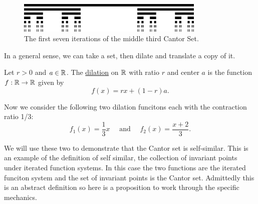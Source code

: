 \begin{figure}[h]
    \includegraphics[width=0.8\textwidth]{Content/Images/Cantor_set_in_seven_iterations.jpg}
    \centering
    \caption{The first seven iterations of the middle third Cantor Set.}
\end{figure}
In a general sense, we can take a set, then dilate and translate a copy of it. 

\begin{definition}[Dilation]\cite{GEdgar}
    Let $r>0$ and $a \in \mathbb{R}$.  The \underline{dilation} on $\mathbb{R}$ with ratio $r$ and center $a$ is the function $f: \mathbb{R} \to \mathbb{R}$ given by $$f(x)= rx + (1-r) a.$$
\end{definition}

Now we consider the following two dilation funcitons each with the contraction ratio 1/3: 
$$f_1 (x) = \frac{1}{3}x \quad \text{ and } \quad f_2 (x) = \frac{x+2}{3}.$$


We will use these two to demonstrate that the Cantor set is self-similar.  This is an example of the definition of self similar, the collection of invariant points under iterated function systems.  In this case the two functions are the iterated funciton system and the set of invariant points is the Cantor set.  Admittedly this is an abstract definition so here is a proposition to work through the specific mechanics.  


